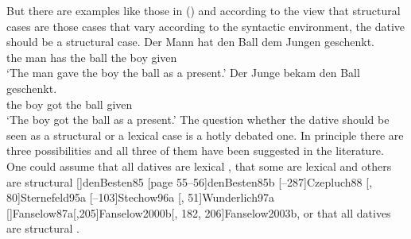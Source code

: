 But there are examples like those in () and according to the view that structural cases are
those cases that vary according to the syntactic environment, the dative should be a structural case.
\eal
\ex 
\gll Der Mann  hat   den Ball dem Jungen geschenkt.\\
     the man   has   the ball the boy given\\
\glt `The man gave the boy the ball as a present.'
\ex 
\gll Der Junge bekam den Ball geschenkt.\\
     the boy   got   the ball given\\   
\glt `The boy got the ball as a present.'
\zl
The question whether the dative should be seen as a structural or a lexical case is a hotly debated
one. In principle there are three possibilities and all three of them have been suggested in the
literature. One could assume that all datives are lexical 
\parencites{Haider85b}%
[]{Haider86}[, 217, 228]{HM94a}%
{Mueller99a,Mueller2001a}[]{Mueller2003e}%
[]{Scherpenisse86a}%
[, 291]{Pollard94a}%
[]{Meurers99b}[]{VS98a}[]{Abraham95a-u}%
[]{McIntyre2006a}, 
that some are lexical and others are structural 
\parencites
{Wegener85a}%
{Wegener90}%
[]{denBesten85}%
[page 55--56]{denBesten85b}%
[--287]{Czepluch88}%
[, 80]{Sternefeld95a}%
[--103]{Stechow96a}%
[, 51]{Wunderlich97a}%
[]{Fanselow87a}[,205]{Fanselow2000b}[, 182, 206]{Fanselow2003b},%
or that all datives are structural 
\parencites[]{Sternefeld95a}%
[, 205--206]{Ryu97a}%
[--97]{Gunkel2003b}.%

